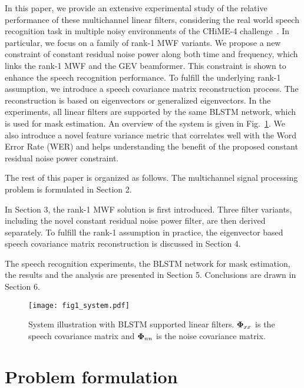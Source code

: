 \documentclass[review]{elsarticle}
\newif\ifproofread
\newcommand{\pfmarker}[1]{%
\ifproofread
\textcolor{red}{#1}%
\else
#1%
\fi
}
\begin{document}
In this paper, we provide an extensive experimental study of the relative performance of these multichannel linear filters, considering the real world speech recognition task in multiple noisy environments of the CHiME-4 challenge~\cite{2016chime4}. In particular, we focus on a family of rank-1 MWF variants. We propose a new constraint of constant residual noise power along both time and frequency, which links the rank-1 MWF and the GEV beamformer. This constraint is shown to enhance the speech recognition performance. To fulfill the underlying rank-1 assumption, we introduce a speech covariance matrix reconstruction process. The reconstruction is based on eigenvectors or generalized eigenvectors. In the experiments, all linear filters are supported by the same BLSTM network, which is used for mask estimation. An overview of the system is given in Fig.~\ref{fig1}. We also introduce a novel feature variance metric that correlates well with the Word Error Rate (WER) and helps understanding the benefit of the proposed constant residual noise power constraint.

The rest of this paper is organized as follows. The multichannel signal processing problem is formulated in Section 2. \pfmarker{In Section 3, the rank-1 MWF solution is first introduced. Three filter variants, including the novel constant residual noise power filter, are then derived separately. To fulfill the rank-1 assumption in practice, the eigenvector based speech covariance matrix reconstruction is discussed in Section 4.} The speech recognition experiments, the BLSTM network for mask estimation, the results and the analysis are presented in Section 5. Conclusions are drawn in Section 6.


\begin{figure}[t!]
	\centering
	\texttt{[image: fig1\_system.pdf]}
	\caption{System illustration with BLSTM supported linear filters. ${\bf \Phi}_{xx}$ is the speech covariance matrix and ${\bf \Phi}_{nn}$ is the noise covariance matrix.}
	\label{fig1}
\end{figure}

\section{Problem formulation}
\end{document}
